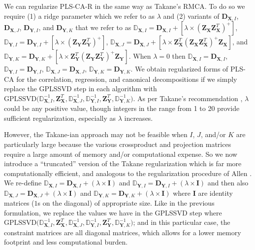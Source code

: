 \documentclass[12pt]{article}
\begin{document}
We can regularize PLS-CA-R in the same way as Takane's RMCA. To do so we
require (1) a ridge parameter which we refer to as \(\lambda\) and (2)
variants of \({\mathbf D}_{{\mathbf X},I}\),
\({\mathbf D}_{{\mathbf X},J}\), \({\mathbf D}_{{\mathbf Y},I}\), and
\({\mathbf D}_{{\mathbf Y},K}\) that we refer to as
\({\mathbb D}_{{\mathbf X},I} = {\mathbf D}_{{\mathbf X},I} + [\lambda \times ({\mathbf Z}_{\mathbf X}{\mathbf Z}_{\mathbf X}^{T})^{+}]\),
\({\mathbb D}_{{\mathbf Y},I} = {\mathbf D}_{{\mathbf Y},I} + [\lambda \times ({\mathbf Z}_{\mathbf Y}{\mathbf Z}_{\mathbf Y}^{T})^{+}]\),
\({\mathbb D}_{{\mathbf X},J} = {\mathbf D}_{{\mathbf X},J} + [\lambda \times {\mathbf Z}_{\mathbf X}^{T}({\mathbf Z}_{\mathbf X}{\mathbf Z}_{\mathbf X}^{T})^{+}{\mathbf Z}_{\mathbf X}]\),
and
\({\mathbb D}_{{\mathbf Y},K} = {\mathbf D}_{{\mathbf Y},K} + [\lambda \times {\mathbf Z}_{\mathbf Y}^{T}({\mathbf Z}_{\mathbf Y}{\mathbf Z}_{\mathbf Y}^{T})^{+}{\mathbf Z}_{\mathbf Y}]\).
When \(\lambda = 0\) then
\({\mathbb D}_{{\mathbf X},I} = {\mathbf D}_{{\mathbf X},I}\),
\({\mathbb D}_{{\mathbf Y},I} = {\mathbf D}_{{\mathbf Y},I}\),
\({\mathbb D}_{{\mathbf X},J} = {\mathbf D}_{{\mathbf X},J}\),
\({\mathbb D}_{{\mathbf Y},K} = {\mathbf D}_{{\mathbf Y},K}\). We obtain
regularized forms of PLS-CA for the correlation, regression, and
canonical decompositions if we simply replace the GPLSSVD step in each
algorithm with
\(\mathrm{GPLSSVD(}{\mathbb D}_{{\mathbf X},I}^{-1},{\mathbf Z}_{\mathbf X}^{T}, {\mathbb D}_{{\mathbf X},J}^{-1}, {\mathbb D}_{{\mathbf Y},I}^{-1},{\mathbf Z}_{\mathbf Y}^{T}, {\mathbb D}_{{\mathbf Y},K}^{-1} \mathrm{)}\).
As per Takane's recommendation \citep{takane_regularized_2006},
\(\lambda\) could be any positive value, though integers in the range
from 1 to 20 provide sufficient regularization, especially as
\(\lambda\) increases.

However, the Takane-ian approach may not be feasible when \(I\), \(J\),
and/or \(K\) are particularly large because the various crossproduct and
projection matrices require a large amount of memory and/or
computational expense. So we now introduce a ``truncated'' version of
the Takane regularization which is far more computationally efficient,
and analogous to the regularization procedure of Allen
\citep{allen_sparse_2013, allen_generalized_2014}. We re-define
\({\mathbb D}_{{\mathbf X},I} = {\mathbf D}_{{\mathbf X},I} + (\lambda \times {\mathbf I})\)
and
\({\mathbb D}_{{\mathbf Y},I} = {\mathbf D}_{{\mathbf Y},I} + (\lambda \times {\mathbf I})\)
and then also
\({\mathbb D}_{{\mathbf X},J} = {\mathbf D}_{{\mathbf X},J} + (\lambda \times {\mathbf I})\)
and
\({\mathbb D}_{{\mathbf Y},K} = {\mathbf D}_{{\mathbf Y},K} + (\lambda \times {\mathbf I})\)
where \({\mathbf I}\) are identity matrices (\(1\)s on the diagonal) of
appropriate size. Like in the previous formulation, we replace the
values we have in the GPLSSVD step where
\(\mathrm{GPLSSVD(}{\mathbb D}_{{\mathbf X},I}^{-1},{\mathbf Z}_{\mathbf X}^{T}, {\mathbb D}_{{\mathbf X},J}^{-1}, {\mathbb D}_{{\mathbf Y},I}^{-1},{\mathbf Z}_{\mathbf Y}^{T}, {\mathbb D}_{{\mathbf Y},K}^{-1} \mathrm{)}\);
and in this particular case, the constraint matrices are all diagonal
matrices, which allows for a lower memory footprint and less
computational burden.
\end{document}
